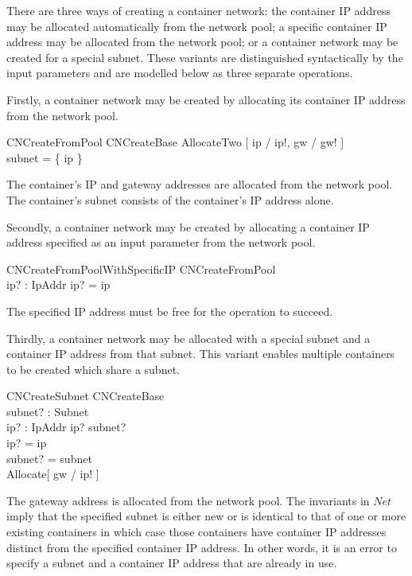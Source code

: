\documentclass[a4paper,twoside,12pt]{article}
\begin{document}
There are three ways of creating a container network: the container IP address may be allocated automatically from the network pool; a specific container IP address may be allocated from the network pool; or a container network may be created for a special subnet. These variants are distinguished syntactically by the input parameters and are modelled below as three separate operations.

Firstly, a container network may be created by allocating its container IP address from the network pool.
\begin{schema}{CNCreateFromPool}
CNCreateBase
\where
AllocateTwo [ ip / ip!, gw / gw! ] \\
subnet = \{ ip \}
\end{schema}
The container's IP and gateway addresses are allocated from the network pool. The container's subnet consists of the container's IP address alone.

Secondly, a container network may be created by allocating a container IP address specified as an input parameter from the network pool.
\begin{schema}{CNCreateFromPoolWithSpecificIP}
CNCreateFromPool \\
ip? : IpAddr
\where
ip? = ip
\end{schema}
The specified IP address must be free for the operation to succeed.

Thirdly, a container network may be allocated with a special subnet and a container IP address from that subnet. This variant enables multiple containers to be created which share a subnet.
\begin{schema}{CNCreateSubnet}
CNCreateBase \\
subnet? : Subnet \\
ip? : IpAddr
\where
ip? \in subnet? \\
ip? = ip \\
subnet? = subnet \\
Allocate[ gw / ip! ]
\end{schema}
The gateway address is allocated from the network pool. The invariants in $Net$ imply that the specified subnet is either new or is identical to that of one or more existing containers in which case those containers have container IP addresses distinct from the specified container IP address. In other words, it is an error to specify a subnet and a container IP address that are already in use.
\end{document}
